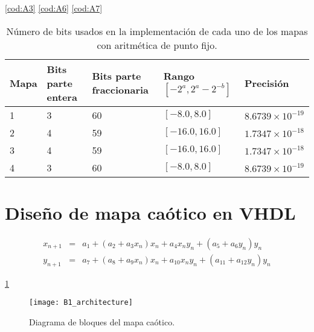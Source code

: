          \ref{cod:A3} \ref{cod:A6} \ref{cod:A7}




         \begin{table}[htbp]
            \centering
            \caption{Número de bits usados en la implementación de cada uno de los mapas con aritmética de punto fijo.}
            \begin{tabular}{|l|l|l|l|l|}
                \hline
                \rowcolor{lightgray} Mapa  & Bits parte entera & Bits parte fraccionaria & Rango $[-2^{a}, 2^{a} - 2^{-b}]$ & Precisión\\
                \hline
                1     & 3                   & 60   & $[-8.0, 8.0]$   & $8.6739 \times 10^{-19}$\\
                \hline
                2     & 4                   & 59   & $[-16.0, 16.0]$ & $1.7347 \times 10^{-18}$\\
                \hline
                3     & 4                   & 59   & $[-16.0, 16.0]$ & $1.7347 \times 10^{-18}$\\
                \hline
                4     & 3                   & 60   & $[-8.0, 8.0]$   & $8.6739 \times 10^{-19}$\\
                \hline
            \end{tabular}
        \end{table}


        
    \section{Diseño de mapa caótico en VHDL}

        \begin{equation}
            \begin{array}{ccl}
                x_{n+1} & = &  a_{1} + ( a_{2} + a_{3}x_{n} )x_{n} + a_{4}x_{n}y_{n} + ( a_{5} + a_{6}y_{n} )y_{n} \\
                y_{n+1} & = &  a_{7} + ( a_{8} + a_{9}x_{n} )x_{n} + a_{10}x_{n}y_{n} + ( a_{11} + a_{12}y_{n})y_{n}
            \end{array}
        \end{equation}

      \ref{}
        
        \begin{figure}[hbtp]
            \caption{Diagrama de bloques del mapa caótico.}
            \centering
            \texttt{[image: B1\_architecture]}
            \label{fig:B1_architecture}
        \end{figure}

